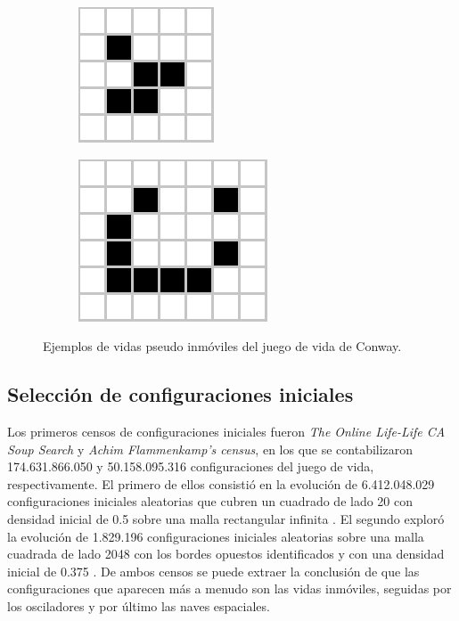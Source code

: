 \documentclass[../proyecto.tex]{memoir}
\begin{document}
\begin{figure}[H]
	\centering
	\begin{subfigure}[b]{0.3\linewidth} 
        \centering
        \includegraphics[height=.35\linewidth]{./images/glider.png}
        \caption{}
        \label{fig:glider}
    \end{subfigure}
    \quad
	\begin{subfigure}[b]{0.3\linewidth} 
        \centering
        \includegraphics[height=0.45\linewidth]{./images/lightweightspaceship.png}
        \caption{}
        \label{fig:lightweightspaceship}
    \end{subfigure}
	\caption{Ejemplos de vidas pseudo inmóviles del juego de vida de Conway.}
	\label{fig:congIniciales4}
\end{figure} 

\subsection{Selección de configuraciones iniciales}

Los primeros censos de configuraciones iniciales fueron \textit{The Online Life-Life CA Soup Search} y \textit{Achim Flammenkamp's census}, en los que se contabilizaron 174.631.866.050 y 50.158.095.316 configuraciones del juego de vida, respectivamente. El primero de ellos consistió en la evolución de 6.412.048.029 configuraciones iniciales aleatorias que cubren un cuadrado de lado 20 con densidad inicial de 0.5 sobre una malla rectangular infinita \cite{sopa1}. El segundo exploró la evolución de 1.829.196 configuraciones iniciales aleatorias sobre una malla cuadrada de lado 2048 con los bordes opuestos identificados y con una densidad inicial de 0.375 \cite{sopa2}. De ambos censos se puede extraer la conclusión de que las configuraciones que aparecen más a menudo son las vidas inmóviles, seguidas por los osciladores y por último las naves espaciales.
\end{document}
